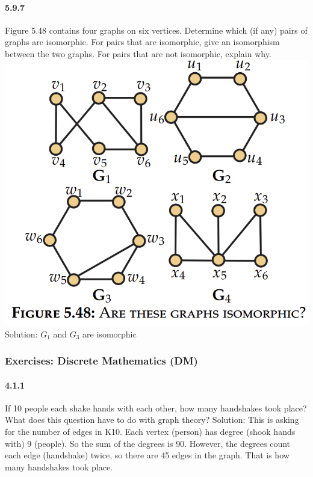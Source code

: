 \documentclass{article}
\begin{document}
\paragraph{5.9.7}
Figure 5.48 contains four graphs on six vertices. Determine which (if any) pairs of graphs are isomorphic. For pairs that are isomorphic, give an isomorphism between the two graphs. For pairs that are not isomorphic, explain why.\newline
\includegraphics{0039}\newline
Solution:\newline
$G_1$ and $G_3$ are isomorphic
\subsubsection{Exercises: Discrete Mathematics (DM)}
\paragraph{4.1.1}
If 10 people each shake hands with each other, how many handshakes took place? What does this question have to do with graph theory?\newline
Solution:\newline
This is asking for the number of edges in K10. Each vertex (person)
has degree (shook hands with) 9 (people). So the sum of the degrees is 90.
However, the degrees count each edge (handshake) twice, so there are 45
edges in the graph. That is how many handshakes took place.
\end{document}
